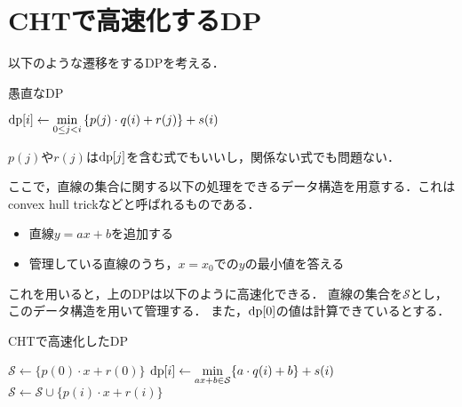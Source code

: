 \documentclass{jsarticle}
\newcommand{\DP}{\ensuremath\mathrm{dp}}
\begin{document}
\section{CHTで高速化するDP}

以下のような遷移をするDPを考える．
\begin{alg}
  \caption{愚直なDP}
  {
    {$\displaystyle\DP[i] \gets \min_{0\le j < i}\,\{p(j)\cdot q(i) + r(j)\} + s(i)$}\;
  }
\end{alg}

\noindent
$p(j)$や$r(j)$は$\DP[j]$を含む式でもいいし，関係ない式でも問題ない．

ここで，直線の集合に関する以下の処理をできるデータ構造を用意する．これはconvex hull trickなどと呼ばれるものである．
\begin{itemize}
\item 直線$y=ax+b$を追加する
\item 管理している直線のうち，$x=x_0$での$y$の最小値を答える
\end{itemize}

これを用いると，上のDPは以下のように高速化できる．
直線の集合を$\mathcal{S}$とし，このデータ構造を用いて管理する．
また，$\DP[0]$の値は計算できているとする．
\begin{alg}
  \caption{CHTで高速化したDP}
  {$\mathcal{S} \gets \{p(0)\cdot x+r(0)\}$}\;
  {
    {$\displaystyle\DP[i] \gets \min_{ax+b\in\mathcal{S}} \{a\cdot q(i)+b\}+s(i)$}\;
    {$\mathcal{S} \gets \mathcal{S} \cup \{p(i)\cdot x+r(i)\}$}\;
  }
\end{alg}
\end{document}

